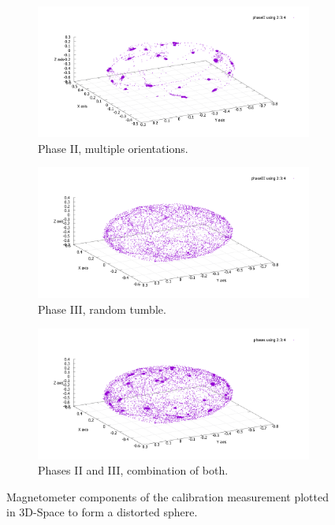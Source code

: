 \begin{figure}[h]
\begin{subfigure}[t]{.33\textwidth}
  \centering
  \includegraphics[width=.8\linewidth]{images/04_results/raw_sphere_calibration_phase_II.pdf}
  \caption{Phase II, multiple orientations.}
  \label{fig:res:raw_calibration_three_phase_II}
\end{subfigure}%
\begin{subfigure}[t]{.33\textwidth}
  \centering
  \includegraphics[width=.8\linewidth]{images/04_results/raw_sphere_calibration_phase_III.pdf}
  \caption{Phase III, random tumble.}
  \label{fig:res:raw_calibration_three_phase_III}
\end{subfigure}
\begin{subfigure}[t]{.33\textwidth}
  \centering
  \includegraphics[width=.8\linewidth]{images/04_results/raw_sphere_calibration_phases_II_III.pdf}
  \caption{Phases II and III, combination of both.}
\end{subfigure}
\caption{Magnetometer components of the calibration measurement plotted in 3D-Space to form a distorted sphere.}
\label{fig:res:raw_calibration_three_phases}
\end{figure}


